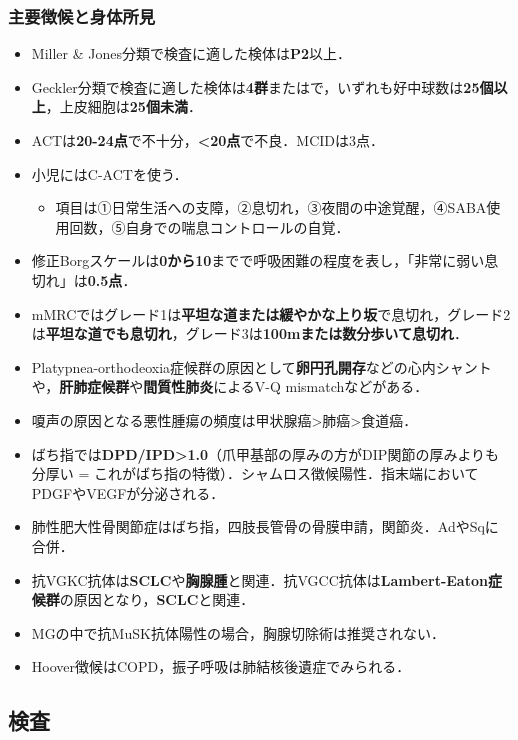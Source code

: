 \subsubsection{主要徴候と身体所見}
\begin{itemize}
\item Miller \& Jones分類で検査に適した検体は\textbf{P2}以上．
\item Geckler分類で検査に適した検体は\textbf{4群}またはで，いずれも好中球数は\textbf{25個以上}，上皮細胞は\textbf{25個未満}．
\item ACTは\textbf{20-24点}で不十分，\textbf{<20点}で不良．MCIDは3点．
\item 小児にはC-ACTを使う．
\begin{itemize}
\item 項目は①日常生活への支障，②息切れ，③夜間の中途覚醒，④SABA使用回数，⑤自身での喘息コントロールの自覚．
\end{itemize}
\item 修正Borgスケールは\textbf{0から10}までで呼吸困難の程度を表し，「非常に弱い息切れ」は\textbf{0.5点}．
\item mMRCではグレード1は\textbf{平坦な道または緩やかな上り坂}で息切れ，グレード2は\textbf{平坦な道でも息切れ}，グレード3は\textbf{100mまたは数分歩いて息切れ}．
\item Platypnea-orthodeoxia症候群の原因として\textbf{卵円孔開存}などの心内シャントや，\textbf{肝肺症候群}や\textbf{間質性肺炎}によるV-Q mismatchなどがある．
\item 嗄声の原因となる悪性腫瘍の頻度は甲状腺癌>肺癌>食道癌．
\item ばち指では\textbf{DPD/IPD>1.0}（爪甲基部の厚みの方がDIP関節の厚みよりも分厚い = これがばち指の特徴）．シャムロス徴候陽性．指末端においてPDGFやVEGFが分泌される．
\item 肺性肥大性骨関節症はばち指，四肢長管骨の骨膜申請，関節炎．AdやSqに合併．
\item 抗VGKC抗体は\textbf{SCLC}や\textbf{胸腺腫}と関連．抗VGCC抗体は\textbf{Lambert-Eaton症候群}の原因となり，\textbf{SCLC}と関連．
\item MGの中で抗MuSK抗体陽性の場合，胸腺切除術は推奨されない．
\item Hoover徴候はCOPD，振子呼吸は肺結核後遺症でみられる．

\end{itemize}
\subsection{検査}

